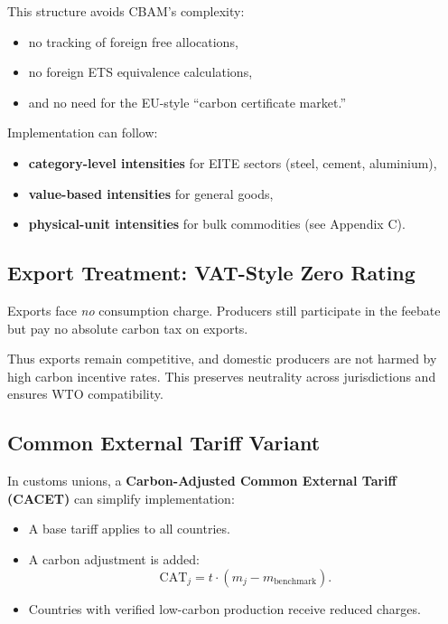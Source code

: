 \documentclass[12pt]{article}
\begin{document}
This structure avoids CBAM’s complexity:
\begin{itemize}
    \item no tracking of foreign free allocations,
    \item no foreign ETS equivalence calculations,
    \item and no need for the EU-style “carbon certificate market.”
\end{itemize}

Implementation can follow:
\begin{itemize}
    \item \textbf{category-level intensities} for EITE sectors (steel, cement, aluminium),
    \item \textbf{value-based intensities} for general goods,
    \item \textbf{physical-unit intensities} for bulk commodities (see Appendix C).
\end{itemize}

\subsection{Export Treatment: VAT-Style Zero Rating}

Exports face \emph{no} consumption charge.  
Producers still participate in the feebate but pay no absolute carbon tax on exports.

Thus exports remain competitive, and domestic producers are not harmed by high
carbon incentive rates.  
This preserves neutrality across jurisdictions and ensures WTO compatibility.

\subsection{Common External Tariff Variant}

In customs unions, a \textbf{Carbon-Adjusted Common External Tariff (CACET)} can
simplify implementation:

\begin{itemize}
    \item A base tariff applies to all countries.
    \item A carbon adjustment is added:
    \[
    \text{CAT}_j = t \cdot (m_j - m_{\text{benchmark}}).
    \]
    \item Countries with verified low-carbon production receive reduced charges.
\end{itemize}
\end{document}
